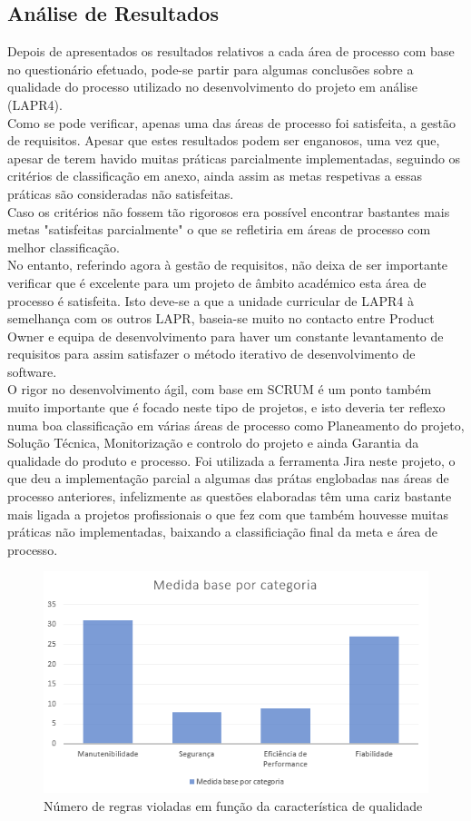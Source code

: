 \documentclass[openany,10pt,a4paper]{article}
\begin{document}
\subsection{Análise de Resultados}
Depois de apresentados os resultados relativos a cada área de processo com base no questionário efetuado, pode-se partir para algumas conclusões sobre a qualidade do processo utilizado no desenvolvimento do projeto em análise (LAPR4). \\
Como se pode verificar, apenas uma das áreas de processo foi satisfeita, a gestão de requisitos. Apesar que estes resultados podem ser enganosos, uma vez que, apesar de terem havido muitas práticas parcialmente implementadas, seguindo os critérios de classificação em anexo, ainda assim as metas respetivas a essas práticas são consideradas não satisfeitas.\\
Caso os critérios não fossem tão rigorosos era possível encontrar bastantes mais metas "satisfeitas parcialmente" o que se refletiria em áreas de processo com melhor classificação.\\
No entanto, referindo agora à gestão de requisitos, não deixa de ser importante verificar que é excelente para um projeto de âmbito académico esta área de processo é satisfeita. Isto deve-se a que a unidade curricular de LAPR4 à semelhança com os outros LAPR, baseia-se muito no contacto entre Product Owner e equipa de desenvolvimento para haver um constante levantamento de requisitos para assim satisfazer o método iterativo de desenvolvimento de software. \\
O rigor no desenvolvimento ágil, com base em SCRUM é um ponto também muito importante que é focado neste tipo de projetos, e isto deveria ter reflexo numa boa classificação em várias áreas de processo como Planeamento do projeto, Solução Técnica, Monitorização e controlo do projeto e ainda Garantia da qualidade do produto e processo. Foi utilizada a ferramenta Jira neste projeto, o que deu a implementação parcial a algumas das prátas englobadas nas áreas de processo anteriores, infelizmente as questões elaboradas têm uma cariz bastante mais ligada a projetos profissionais o que fez com que também houvesse muitas práticas não implementadas, baixando a classificiação final da meta e área de processo.

\begin{figure}[h]
	\centering
	\includegraphics[width=0.7\linewidth]{graph_results_product.PNG}
	\caption{Número de regras violadas em função da característica de qualidade \small}
	\label{fig_quality}
\end{figure}
\end{document}
